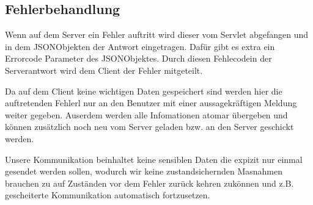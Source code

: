 	\subsection{Fehlerbehandlung}
Wenn auf dem Server ein Fehler auftritt wird dieser vom Servlet abgefangen und in dem JSONObjekten der Antwort eingetragen. Dafür gibt es extra ein Errorcode Parameter des JSONObjektes. Durch diesen Fehlecodein der Serverantwort wird dem Client der Fehler mitgeteilt.\par

Da auf dem Client keine wichtigen Daten gespeichert sind werden hier die auftretenden Fehlerl nur an den Benutzer mit einer aussagekräftigen Meldung weiter gegeben. Auserdem werden alle Infomationen atomar übergeben und können zusätzlich noch neu vom Server geladen bzw. an den Server geschickt werden. \par

Unsere Kommunikation beinhaltet keine sensiblen Daten die expizit nur einmal gesendet werden sollen, wodurch wir keine zustandsichernden Masnahmen brauchen zu auf Zuständen vor dem Fehler zurück kehren zukönnen und z.B. gescheiterte Kommunikation automatisch fortzusetzen.
	



		


	\newpage
